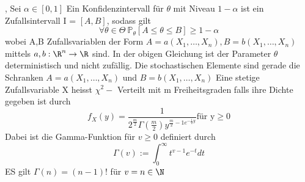 \sep
\Def[2.1] \newline
Sei \( \alpha \in [0,1]\) Ein Konfidenzintervall für \( \theta \) mit Niveau \(1 - \alpha \) ist ein Zufallsintervall I = \([A,B ]\), sodass gilt
\[ \forall \theta \in \Theta \ \mathbb{P}_\theta[A \leq \theta \leq B ] \geq 1 - \alpha \]
wobei A,B Zufallsvariablen der Form \( A = a(X_1, \dots , X_n ), B = b(X_1, \dots , X_n )\) mittels \( a,b : \R^n \rightarrow \R \) sind.
\Bem[2.2] \newline
In der obigen Gleichung ist der Parameter  \( \theta \) deterministisch und nicht zufällig. Die stochastischen Elemente sind gerade die Schranken \( A = a(X_1, \dots , X_n )\) und \( B = b(X_1, \dots , X_n)\)
\Def[2.3] \newline
Eine stetige Zufallsvariable X heisst \( \chi^2-\) Verteilt mit m Freiheitsgraden falls ihre Dichte gegeben ist durch \[ f_X(y) = \frac{1}{2^{\frac{m}{2}}\Gamma(\frac{m}{2})y^{\frac{m}{2}-1e^{-\frac{1}{2}y}}} \text{für y} \geq 0\]
Dabei ist die Gamma-Funktion für \( v \geq 0\) definiert durch \[ \Gamma(v) := \int_0^\infty t^{v-1}e^{-t}dt\]
ES gilt \(\Gamma(n) = (n-1)! \) für \(v = n \in \N \)
\Bem[2.3A] 